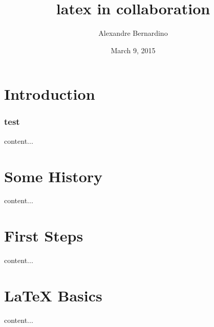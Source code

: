 \documentclass{beamer}
\title[latex in collaboration]{latex in collaboration}
\author{Alexandre Bernardino}
\institute{ISR/IST}
\date{March 9, 2015}
\begin{document}
\begin{frame}
\titlepage
\end{frame}

\section{Introduction}
\begin{frame}
\frametitle{test}
content...
\end{frame}

\section{Some History}
\begin{frame}
content...
\end{frame}


\section{First Steps}
\begin{frame}
content...
\end{frame}

\section{\LaTeX{} Basics}

\begin{frame}
content...
\end{frame}
\end{document}
